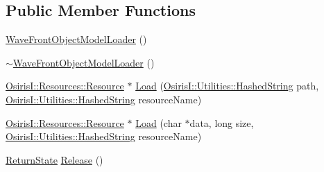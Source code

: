 \subsection*{Public Member Functions}
\begin{DoxyCompactItemize}
\item 
\hyperlink{class_osiris_i_1_1_resources_1_1_loader_1_1_wave_front_object_model_loader_a7d6e4e24b3997ac43c44a736083b47bb}{Wave\-Front\-Object\-Model\-Loader} ()
\item 
\hyperlink{class_osiris_i_1_1_resources_1_1_loader_1_1_wave_front_object_model_loader_aacf5c1b24df9b115dd8e80cd02de6b76}{$\sim$\-Wave\-Front\-Object\-Model\-Loader} ()
\item 
\hyperlink{class_osiris_i_1_1_resources_1_1_resource}{Osiris\-I\-::\-Resources\-::\-Resource} $\ast$ \hyperlink{class_osiris_i_1_1_resources_1_1_loader_1_1_wave_front_object_model_loader_a21852f9e288d0d1eac93a8bc55d7efe2}{Load} (\hyperlink{class_osiris_i_1_1_utilities_1_1_hashed_string}{Osiris\-I\-::\-Utilities\-::\-Hashed\-String} path, \hyperlink{class_osiris_i_1_1_utilities_1_1_hashed_string}{Osiris\-I\-::\-Utilities\-::\-Hashed\-String} resource\-Name)
\item 
\hyperlink{class_osiris_i_1_1_resources_1_1_resource}{Osiris\-I\-::\-Resources\-::\-Resource} $\ast$ \hyperlink{class_osiris_i_1_1_resources_1_1_loader_1_1_wave_front_object_model_loader_a8e5dcd5e2573002f75a9b11acbb6c7f1}{Load} (char $\ast$data, long size, \hyperlink{class_osiris_i_1_1_utilities_1_1_hashed_string}{Osiris\-I\-::\-Utilities\-::\-Hashed\-String} resource\-Name)
\item 
\hyperlink{namespace_osiris_i_a8f53bf938dc75c65c6a529694514013e}{Return\-State} \hyperlink{class_osiris_i_1_1_resources_1_1_loader_1_1_wave_front_object_model_loader_ad55f7f6443130d3768bf2ec3dead95bd}{Release} ()
\end{DoxyCompactItemize}


